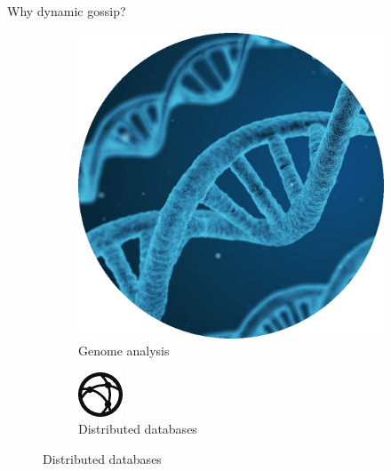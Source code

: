 \documentclass[aspectratio=169]{beamer}
\begin{document}
\begin{frame}[c]{Why dynamic gossip?}
\begin{figure}
      \bigskip

      \begin{subfigure}[t]{.3\paperwidth}
        \centering
        \includegraphics[height=.3\paperheight]{images/dna.png}
        \caption*{Genome analysis}
      \end{subfigure}
      \qquad
      \begin{subfigure}[t]{.3\paperwidth}
        \centering
        \includegraphics[height=.3\paperheight]{images/network.pdf}
        \caption*{Distributed databases}
      \end{subfigure}
    \end{figure}
\end{frame}
\end{document}
